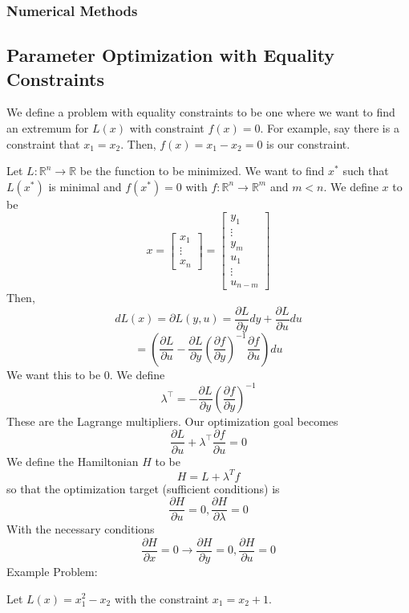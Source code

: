 \documentclass{article}
\begin{document}
\subsubsection{Numerical Methods}

\subsection{Parameter Optimization with Equality Constraints}

We define a problem with equality constraints to be one where
we want to find an extremum for $L(x)$ with constraint $f(x) = 0$. For example,
say there is a constraint that $x_1 = x_2$. Then, $f(x) = x_1 - x_2 = 0$ is our constraint.

\noindent
Let $L : \mathbb{R}^n \rightarrow \mathbb{R}$ be the function to be minimized.
We want to find $x^*$ such that $L(x^*)$ is minimal and $f(x^*) = 0$ with
$f : \mathbb{R}^n \rightarrow \mathbb{R}^m$ and $m < n$. We define $x$ to be
\[x = \left[\begin{matrix}
    x_1 \\ \vdots \\ x_n
\end{matrix}\right] = \left[\begin{matrix}
    y_1 \\ \vdots \\ y_m \\ u_1 \\ \vdots \\ u_{n-m}
\end{matrix}\right]\]
Then,
\[dL(x) = \partial L(y,u) = \frac{\partial L}{\partial y}dy + \frac{\partial L}{\partial u}du\]
\[= \left(\frac{\partial L}{\partial u}-\frac{\partial L}{\partial y}
\left(\frac{\partial f}{\partial y}\right)^{-1}\frac{\partial f}{\partial u}\right)du\]
We want this to be 0. We define
\[\lambda^\top = -\frac{\partial L}{\partial y}\left(\frac{\partial f}{\partial y}\right)^{-1}\]
These are the Lagrange multipliers. Our optimization goal becomes
\[\frac{\partial L}{\partial u}+\lambda^\top\frac{\partial f}{\partial u} = 0\]
We define the Hamiltonian $H$ to be
\[H = L + \lambda^T f\]
so that the optimization target (sufficient conditions) is
\[\frac{\partial H}{\partial u} = 0, \frac{\partial H}{\partial \lambda} = 0\]
With the necessary conditions
\[\frac{\partial H}{\partial x} = 0 \rightarrow \frac{\partial H}{\partial y} = 0,
\frac{\partial H}{\partial u} = 0\]
Example Problem:

\noindent
Let $L(x) = x_1^2 - x_2$ with the constraint $x_1 = x_2 + 1$.
\end{document}
